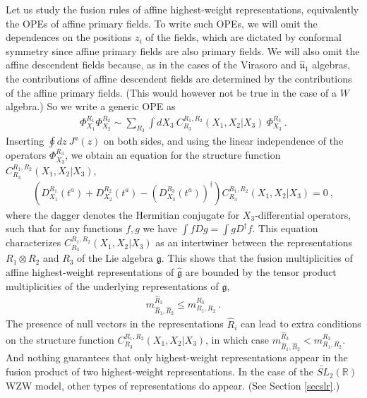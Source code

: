\documentclass[12pt,a4paper,notitlepage]{report}
\numberwithin{equation}{section}
\theoremstyle{break}
\begin{document}
Let us study the fusion rules of affine highest-weight representations, equivalently the OPEs of affine primary fields.
To write such OPEs, we will omit the dependences on the positions $z_i$ of the fields, which are dictated by conformal symmetry since affine primary fields are also primary fields.
We will also omit the affine descendent fields because, as in the cases of the Virasoro and $\hat{\mathfrak{u}}_1$ algebras, the contributions of affine descendent fields are determined by the contributions of the affine primary fields. (This would however not be true in the case of a $W$ algebra.) So we write a generic OPE as 
\begin{align}
 \Phi^{R_1}_{X_1}\Phi^{R_2}_{X_2} \sim \sum_{R_3} \int dX_3\ C^{R_1,R_2}_{R_3}(X_1,X_2|X_3)\ \Phi^{R_3}_{X_3}\ .
\end{align}
Inserting $\oint dz\ J^a(z)$ on both sides, and using the linear independence of the operators $\Phi^{R_3}_{X_3}$, we obtain an equation for the structure function $C^{R_1,R_2}_{R_3}(X_1,X_2|X_3)$,
\begin{align}
 \left(D_{X_1}^{R_1}(t^a)+D_{X_2}^{R_2}(t^a)-\left(D_{X_3}^{R_3}(t^a)\right)^\dagger\right) C^{R_1,R_2}_{R_3}(X_1,X_2|X_3) = 0\ ,
\label{dddc}
\end{align}
where the dagger denotes the Hermitian conjugate for $X_3$-differential operators, such that for any functions $f,g$ we have 
$\int fDg =\int g D^\dagger f$.
This equation characterizes $C^{R_1,R_2}_{R_3}(X_1,X_2|X_3)$ as an intertwiner between the representations $R_1\otimes R_2$ and $R_3$ of the Lie algebra $\mathfrak{g}$.
This shows that the fusion multiplicities of affine highest-weight representations of $\hat{\mathfrak{g}}$ are bounded by the tensor product multiplicities of the underlying representations of $\mathfrak{g}$, 
\begin{align}
 m_{\hat{R}_1,\hat{R}_2}^{\hat{R}_3} \leq m_{R_1,R_2}^{R_3}\ .
\end{align}
The presence of null vectors in the representations $\hat{R}_i$ can lead to extra conditions on the structure function $C^{R_1,R_2}_{R_3}(X_1,X_2|X_3)$, in which case $m_{\hat{R}_1,\hat{R}_2}^{\hat{R}_3} < m_{R_1,R_2}^{R_3}$. 
And nothing guarantees that only highest-weight representations appear in the fusion product of two highest-weight representations. 
In the case of the $\widetilde{SL}_2(\mathbb{R})$ WZW model, other types of representations do appear. (See Section \ref{secslr}.) 
\end{document}

